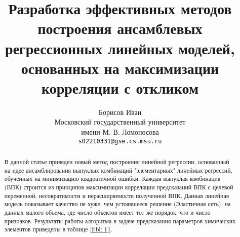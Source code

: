 \documentclass{article}
\title{Разработка эффективных методов построения ансамблевых регрессионных линейных моделей, основанных на максимизации корреляции с откликом}
\author{
 Борисов Иван \\
  Московский государственный университет \\
  имени М. В. Ломоносова  \\
  \texttt{s02210331@gse.cs.msu.ru} \\
}
\begin{document}
\maketitle
\begin{abstract}
В данной статье приведен новый метод построения линейной регрессии, основанный на идее ансамблирования выпуклых комбинаций "элементарных" линейных регрессий, обученных на минимизацию квадратичной ошибки. Каждая выпуклая комбинация (ВПК) строится из принципов максимизации корреляции предсказаний ВПК с целевой переменной, несократимости и нерасширяемости полученной ВПК. Данная линейная модель показывает качество не хуже, чем устоявшееся решение (Эластичная сеть), на данных малого объема, где число объектов имеет тот же порядок, что и число признаков. Результаты работы алгоритма в задаче предсказания параметров химических элементов приведены в таблице [\ref{tbl: 1}].
\end{abstract}

\newpage
\end{document}
